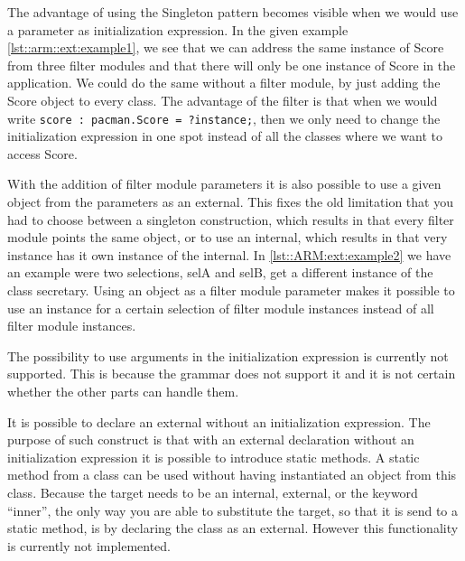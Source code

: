 The advantage of using the Singleton pattern becomes visible when we would use a parameter as initialization expression. 
In the given example \autoref{lst::arm::ext:example1}, we see that we can address the same instance of Score from three filter modules and that there will only be one instance of Score in the application. 
We could do the same without a filter module, by just adding the Score object to every class. 
The advantage of the filter is that when we would write \lstinline[breaklines=false]!score : pacman.Score = ?instance;!, then we only need to change the initialization expression in one spot instead of all the classes where we want to access Score.

With the addition of filter module parameters it is also possible to use a given object from the parameters as an
external. 
This fixes the old limitation that you had to choose between a singleton construction, which results in that every filter module points the same object, or to use an internal, which results in that very instance has it own instance of the internal. 
In \autoref{lst::ARM:ext:example2} we have an example were two selections, selA and selB, get a different instance of the class secretary. 
Using an object as a filter module parameter makes it possible to use an instance for a certain selection of filter module instances instead of all filter module instances.

The possibility to use arguments in the initialization expression is currently not supported. 
This is because the grammar does not support it and it is not certain whether the other parts can handle them. 

It is possible to declare an external without an initialization expression.
The purpose of such construct is that with an external declaration without an initialization expression it is possible to introduce static methods. 
A static method from a class can be used without having instantiated an object from this class.
Because the target needs to be an internal, external, or the keyword ``inner'', the only way you are able to substitute the target, so that it is send to a static method, is by declaring the class as an external.
However this functionality is currently not implemented.